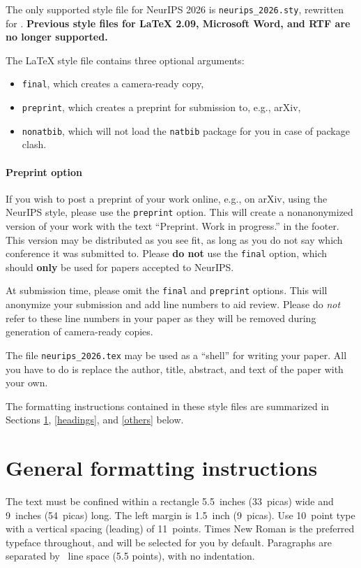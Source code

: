 \documentclass{article}
\begin{document}
The only supported style file for NeurIPS 2026 is \verb+neurips_2026.sty+, rewritten for \LaTeXe{}. \textbf{Previous style files for \LaTeX{} 2.09,  Microsoft Word, and RTF are no longer supported.}


The \LaTeX{} style file contains three optional arguments:
\begin{itemize}
  \item \verb+final+, which creates a camera-ready copy,
  \item \verb+preprint+, which creates a preprint for submission to, e.g., arXiv, \item \verb+nonatbib+, which will not load the \verb+natbib+ package for you in case of package clash.
\end{itemize}


\paragraph{Preprint option}
If you wish to post a preprint of your work online, e.g., on arXiv, using the NeurIPS style, please use the \verb+preprint+ option. This will create a nonanonymized version of your work with the text ``Preprint. Work in progress.'' in the footer. This version may be distributed as you see fit, as long as you do not say which conference it was submitted to. Please \textbf{do not} use the \verb+final+ option, which should \textbf{only} be used for papers accepted to NeurIPS.


At submission time, please omit the \verb+final+ and \verb+preprint+ options. This will anonymize your submission and add line numbers to aid review. Please do \emph{not} refer to these line numbers in your paper as they will be removed during generation of camera-ready copies.


The file \verb+neurips_2026.tex+ may be used as a ``shell'' for writing your paper. All you have to do is replace the author, title, abstract, and text of the paper with your own.


The formatting instructions contained in these style files are summarized in Sections \ref{gen_inst}, \ref{headings}, and \ref{others} below.


\section{General formatting instructions}
\label{gen_inst}


The text must be confined within a rectangle 5.5~inches (33~picas) wide and
9~inches (54~picas) long. The left margin is 1.5~inch (9~picas).  Use 10~point
type with a vertical spacing (leading) of 11~points.  Times New Roman is the
preferred typeface throughout, and will be selected for you by default.
Paragraphs are separated by ~line space (5.5 points), with no
indentation.
\end{document}
